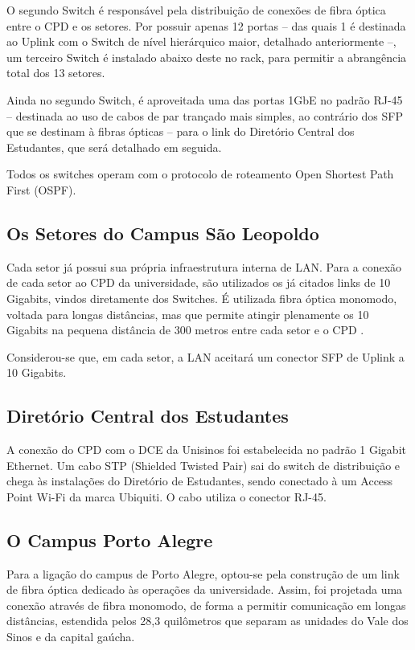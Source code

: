 \documentclass[12pt]{article}
\begin{document}
O segundo Switch é responsável pela distribuição de conexões de fibra óptica entre o CPD e os setores. Por possuir apenas 12 portas -- das quais 1 é destinada ao Uplink com o Switch de nível hierárquico maior, detalhado anteriormente --, um terceiro Switch é instalado abaixo deste no rack, para permitir a abrangência total dos 13 setores.

Ainda no segundo Switch, é aproveitada uma das portas 1GbE no padrão RJ-45 -- destinada ao uso de cabos de par trançado mais simples, ao contrário dos SFP que se destinam à fibras ópticas -- para o link do Diretório Central dos Estudantes, que será detalhado em seguida.

Todos os switches operam com o protocolo de roteamento Open Shortest Path First (OSPF).

\subsection{Os Setores do Campus São Leopoldo}
Cada setor já possui sua própria infraestrutura interna de LAN. Para a conexão de cada setor ao CPD da universidade, são utilizados os já citados links de 10 Gigabits, vindos diretamente dos Switches. É utilizada fibra óptica monomodo, voltada para longas distâncias, mas que permite atingir plenamente os 10 Gigabits na pequena distância de 300 metros entre cada setor e o CPD \cite{fscommunity}.

Considerou-se que, em cada setor, a LAN aceitará um conector SFP de Uplink a 10 Gigabits.

\subsection{Diretório Central dos Estudantes}
A conexão do CPD com o DCE da Unisinos foi estabelecida no padrão 1 Gigabit Ethernet. Um cabo STP (Shielded Twisted Pair) sai do switch de distribuição e chega às instalações do Diretório de Estudantes, sendo conectado à um Access Point Wi-Fi da marca Ubiquiti. O cabo utiliza o conector RJ-45.

\subsection{O Campus Porto Alegre}
Para a ligação do campus de Porto Alegre, optou-se pela construção de um link de fibra óptica dedicado às operações da universidade. Assim, foi projetada uma conexão através de fibra monomodo, de forma a permitir comunicação em longas distâncias, estendida pelos 28,3 quilômetros que separam as unidades do Vale dos Sinos e da capital gaúcha.
\end{document}

